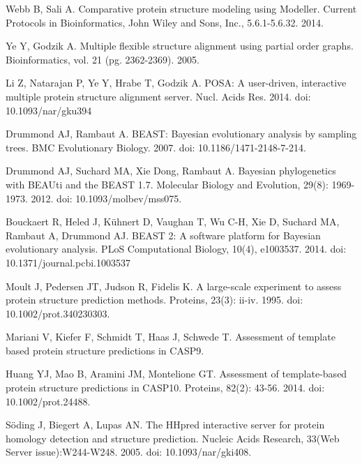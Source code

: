\documentclass[10pt,letterpaper]{article}
\begin{document}
\begin{thebibliography}{10}
Webb B, Sali A.
\newblock Comparative protein structure modeling using Modeller.
\newblock Current Protocols in Bioinformatics, John Wiley and Sons, Inc., 5.6.1-5.6.32. 2014.

Ye Y, Godzik A.
\newblock Multiple flexible structure alignment using partial order graphs.
\newblock Bioinformatics, vol. 21 (pg. 2362-2369). 2005.

Li Z, Natarajan P, Ye Y, Hrabe T, Godzik A.
\newblock POSA: A user-driven, interactive multiple protein structure alignment server.
\newblock Nucl. Acids Res. 2014. doi: 10.1093/nar/gku394

Drummond AJ, Rambaut A.
\newblock BEAST: Bayesian evolutionary analysis by sampling trees.
\newblock BMC Evolutionary Biology. 2007. doi: 10.1186/1471-2148-7-214.

Drummond AJ, Suchard MA, Xie Dong, Rambaut A.
\newblock Bayesian phylogenetics with BEAUti and the BEAST 1.7.
\newblock Molecular Biology and Evolution, 29(8): 1969-1973. 2012. doi: 10.1093/molbev/mss075.

Bouckaert R, Heled J, Kühnert D, Vaughan T, Wu C-H, Xie D, Suchard MA, Rambaut A, Drummond AJ.
\newblock BEAST 2: A software platform for Bayesian evolutionary analysis.
\newblock PLoS Computational Biology, 10(4), e1003537. 2014. doi: 10.1371/journal.pcbi.1003537

Moult J, Pedersen JT, Judson R, Fidelis K.
\newblock A large-scale experiment to assess protein structure prediction methods.
\newblock Proteins, 23(3): ii-iv. 1995. doi: 10.1002/prot.340230303.

Mariani V, Kiefer F, Schmidt T, Haas J, Schwede T.
\newblock Assessment of template based protein structure predictions in CASP9.
\newblock 

Huang YJ, Mao B, Aramini JM, Montelione GT.
\newblock Assessment of template-based protein structure predictions in CASP10.
\newblock Proteins, 82(2): 43-56. 2014. doi: 10.1002/prot.24488.

Söding J, Biegert A, Lupas AN.
\newblock The HHpred interactive server for protein homology detection and structure prediction. 
\newblock Nucleic Acids Research, 33(Web Server issue):W244-W248. 2005. doi: 10.1093/nar/gki408.



\end{thebibliography}
\end{document}
